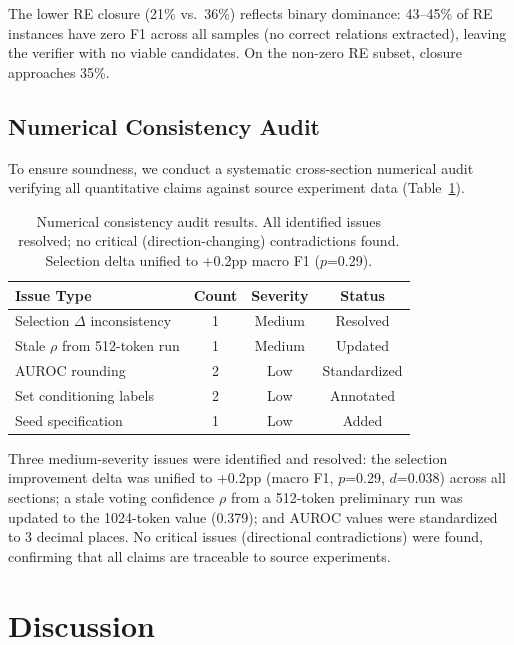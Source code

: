 \documentclass[11pt,a4paper]{article}
\begin{document}
The lower RE closure (21\% vs.\ 36\%) reflects binary dominance: 43--45\% of RE instances have zero F1 across all samples (no correct relations extracted), leaving the verifier with no viable candidates. On the non-zero RE subset, closure approaches 35\%.

\subsection{Numerical Consistency Audit}
\label{sec:audit}

To ensure soundness, we conduct a systematic cross-section numerical audit verifying all quantitative claims against source experiment data (Table~\ref{tab:audit}).

\begin{table}[t]
\centering
\small
\begin{tabular}{lccc}
\toprule
Issue Type & Count & Severity & Status \\
\midrule
Selection $\Delta$ inconsistency & 1 & Medium & Resolved \\
Stale $\rho$ from 512-token run & 1 & Medium & Updated \\
AUROC rounding & 2 & Low & Standardized \\
Set conditioning labels & 2 & Low & Annotated \\
Seed specification & 1 & Low & Added \\
\bottomrule
\end{tabular}
\caption{Numerical consistency audit results. All identified issues resolved; no critical (direction-changing) contradictions found. Selection delta unified to +0.2pp macro F1 ($p$=0.29).}
\label{tab:audit}
\end{table}

Three medium-severity issues were identified and resolved: the selection improvement delta was unified to +0.2pp (macro F1, $p$=0.29, $d$=0.038) across all sections; a stale voting confidence $\rho$ from a 512-token preliminary run was updated to the 1024-token value (0.379); and AUROC values were standardized to 3 decimal places. No critical issues (directional contradictions) were found, confirming that all claims are traceable to source experiments.

\section{Discussion}
\end{document}
